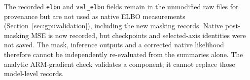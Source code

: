 The recorded \texttt{elbo} and \texttt{val\_elbo} fields remain in the
unmodified raw files for provenance but are not used as native ELBO
measurements (Section~\ref{sec:gpuvalidation}), including the new masking
records. Native post-masking MSE is now recorded, but checkpoints and
selected-axis identities were not saved. The mask, inference outputs
and a corrected native likelihood therefore cannot be independently
re-evaluated from the summaries alone. The analytic ARM-gradient check
validates a component; it cannot replace those model-level records.
